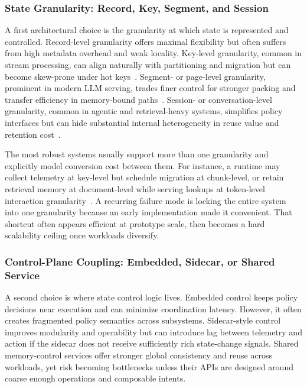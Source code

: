 \documentclass[acmsmall,screen,review]{acmart}
\begin{document}
\subsubsection{State Granularity: Record, Key, Segment, and Session}

A first architectural choice is the granularity at which state is represented and controlled. Record-level granularity offers maximal flexibility but often suffers from high metadata overhead and weak locality. Key-level granularity, common in stream processing, can align naturally with partitioning and migration but can become skew-prone under hot keys~\cite{zhang2019briskstream,mao2025spacker}. Segment- or page-level granularity, prominent in modern LLM serving, trades finer control for stronger packing and transfer efficiency in memory-bound paths~\cite{kwon2023pagedattention,agrawal2024sarathi}. Session- or conversation-level granularity, common in agentic and retrieval-heavy systems, simplifies policy interfaces but can hide substantial internal heterogeneity in reuse value and retention cost~\cite{zheng2023sglang,wang2024hipporag}.

The most robust systems usually support more than one granularity and explicitly model conversion cost between them. For instance, a runtime may collect telemetry at key-level but schedule migration at chunk-level, or retain retrieval memory at document-level while serving lookups at token-level interaction granularity~\cite{khattab2020colbert}. A recurring failure mode is locking the entire system into one granularity because an early implementation made it convenient. That shortcut often appears efficient at prototype scale, then becomes a hard scalability ceiling once workloads diversify.

\subsubsection{Control-Plane Coupling: Embedded, Sidecar, or Shared Service}

A second choice is where state control logic lives. Embedded control keeps policy decisions near execution and can minimize coordination latency. However, it often creates fragmented policy semantics across subsystems. Sidecar-style control improves modularity and operability but can introduce lag between telemetry and action if the sidecar does not receive sufficiently rich state-change signals. Shared memory-control services offer stronger global consistency and reuse across workloads, yet risk becoming bottlenecks unless their APIs are designed around coarse enough operations and composable intents.
\end{document}
